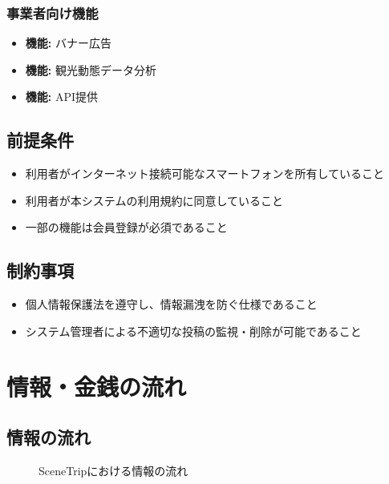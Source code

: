 \documentclass{docs}
\begin{document}
\subsubsection{事業者向け機能}
\begin{itemize}
    \item \textbf{機能:} バナー広告
    \item \textbf{機能:} 観光動態データ分析
    \item \textbf{機能:} API提供
\end{itemize}

\subsection{前提条件}
\begin{itemize}
    \item 利用者がインターネット接続可能なスマートフォンを所有していること
    \item 利用者が本システムの利用規約に同意していること
    \item 一部の機能は会員登録が必須であること
\end{itemize}

\subsection{制約事項}
\begin{itemize}
    \item 個人情報保護法を遵守し、情報漏洩を防ぐ仕様であること
    \item システム管理者による不適切な投稿の監視・削除が可能であること
\end{itemize}

\section{情報・金銭の流れ}
\subsection{情報の流れ}
\begin{figure}[H]
    \centering
    \caption{SceneTripにおける情報の流れ}
    \label{fig:info}
\end{figure}
\end{document}
